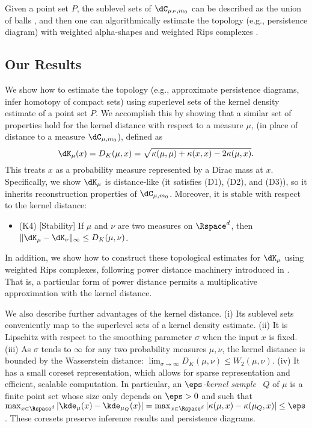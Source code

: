 \documentclass[11pt]{myclass}
\begin{document}
Given a point set $P$, the sublevel sets of $\dC_{\mu_P,m_0}$ can be described as the union of balls \cite{GuibasMerigotMorozov2011}, and then one can algorithmically estimate the topology (e.g., persistence diagram) with weighted alpha-shapes \cite{GuibasMerigotMorozov2011} and weighted Rips complexes \cite{BuchetChazalOudot2013}. 

\subsection{Our Results}
\label{sec:results}

We show how to estimate the topology (e.g., approximate persistence diagrams, infer homotopy of compact sets) using superlevel sets of the kernel density estimate of a point set $P$.  
We accomplish this by showing that a similar set of properties hold for the kernel distance with respect to a measure $\mu$,  
(in place of distance to a measure $\dC_{\mu, m_0}$),  defined as 
\[
\dK_\mu(x) = D_K(\mu,x) = \sqrt{\kappa(\mu,\mu) + \kappa(x,x) - 2\kappa(\mu,x)}.
\]
This treats $x$ as a probability measure represented by a Dirac mass at $x$.  
Specifically, we show $\dK_\mu$ is distance-like (it satisfies (D1), (D2), and (D3)), so it inherits reconstruction properties of $\dC_{\mu,m_0}$.  Moreover, it is stable with respect to the kernel distance:
\begin{itemize}
\item (K4) [Stability] If $\mu$ and $\nu$ are two measures on $\Rspace^d$, then 
$\| \dK_\mu - \dK_\nu \|_\infty \leq D_K(\mu,\nu)$. 
\end{itemize}

In addition, we show how to construct these topological estimates for $\dK_\mu$ using weighted Rips complexes, following power distance machinery introduced in \cite{BuchetChazalOudot2013}.  That is, a particular form of power distance permits a multiplicative approximation with the kernel distance.  

We also describe further advantages of the kernel distance.  
(i) Its sublevel sets conveniently map to the superlevel sets of a kernel density estimate.  
(ii) It is Lipschitz with respect to the smoothing parameter $\sigma$ when the input $x$ is fixed.  
(iii) As $\sigma$ tends to $\infty$ for any two probability measures $\mu,\nu$, the kernel distance is bounded by the Wasserstein distance:  $\lim_{\sigma \to \infty} D_K(\mu,\nu) \leq W_2(\mu,\nu)$.  
(iv) It has a small coreset representation, which allows for sparse representation and efficient, scalable computation.  In particular, an \emph{$\eps$-kernel sample}~\cite{JoshiKommarajuPhillips2011,Phillips2013,big-kde} $Q$ of $\mu$ is a finite point set whose size only depends on $\eps>0$ and such that $\max_{x \in \Rspace^d} |\kde_\mu(x) - \kde_{\mu_Q}(x) | = \max_{x \in \Rspace^d} |\kappa(\mu,x) - \kappa(\mu_Q,x) | \leq \eps$.  These coresets preserve inference results and persistence diagrams.  
\end{document}
